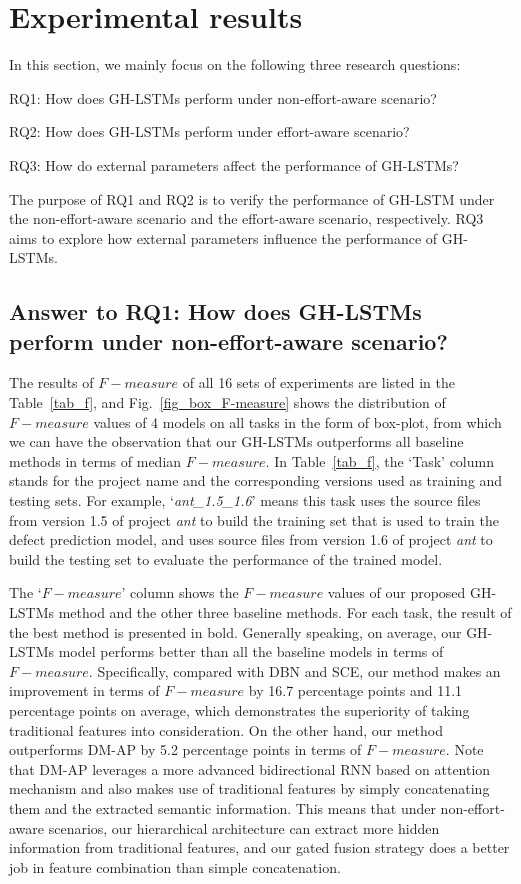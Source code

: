 \documentclass[journal]{IEEEtran}
\begin{document}
\section{Experimental results}
In this section, we mainly focus on the following three research questions:

RQ1: How does GH-LSTMs perform under non-effort-aware scenario?

RQ2: How does GH-LSTMs perform under effort-aware scenario?

RQ3: How do external parameters affect the performance of GH-LSTMs?

The purpose of RQ1 and RQ2 is to verify the performance of GH-LSTM under the non-effort-aware scenario and the effort-aware scenario, respectively. RQ3 aims to explore how external parameters influence the performance of GH-LSTMs.

\subsection{Answer to RQ1: How does GH-LSTMs perform under non-effort-aware scenario?}

The results of $F-measure$ of all 16 sets of experiments are listed in the Table~\ref{tab_f}, and Fig.~\ref{fig_box_F-measure} shows the distribution of $F-measure$ values of 4 models on all tasks in the form of box-plot, from which we can have the observation that our GH-LSTMs outperforms all baseline methods in terms of median $F-measure$. In Table~\ref{tab_f}, the `Task' column stands for the project name and the corresponding versions used as training and testing sets. For example, `\textit{ant\_1.5\_1.6}' means this task uses the source files from version 1.5 of project \textit{ant} to build the training set that is used to train the defect prediction model, and uses source files from version 1.6 of project \textit{ant} to build the testing set to evaluate the performance of the trained model.


The `$F-measure$' column shows the $F-measure$ values of our proposed GH-LSTMs method and the other three baseline methods. For each task, the result of the best method is presented in bold. Generally speaking, on average, our GH-LSTMs model performs better than all the baseline models in terms of $F-measure$. Specifically, compared with DBN and SCE, our method makes an improvement in terms of $F-measure$ by 16.7 percentage points and 11.1 percentage points on average, which demonstrates the superiority of taking traditional features into consideration. On the other hand, our method outperforms DM-AP by 5.2 percentage points in terms of $F-measure$. Note that DM-AP leverages a more advanced bidirectional RNN based on attention mechanism and also makes use of traditional features by simply concatenating them and the extracted semantic information. This means that under non-effort-aware scenarios, our hierarchical architecture can extract more hidden information from traditional features, and our gated fusion strategy does a better job in feature combination than simple concatenation.
\end{document}
